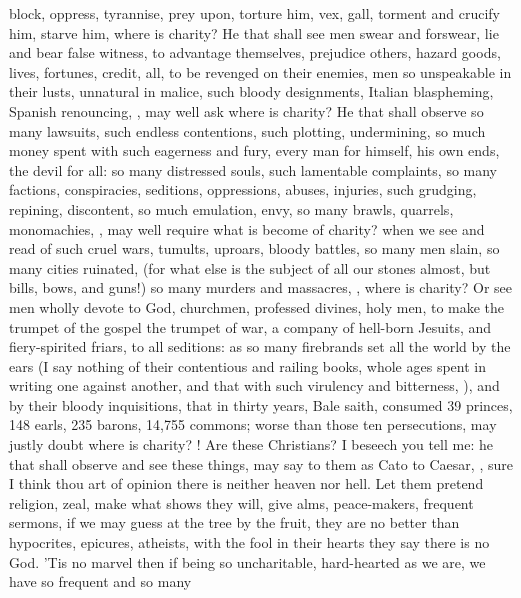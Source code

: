 {block, oppress, tyrannise, prey upon, torture him, vex, gall, torment
and crucify him, starve him, where is charity? He that shall see men
swear and forswear, lie and bear false witness, to advantage
themselves, prejudice others, hazard goods, lives, fortunes, credit,
all, to be revenged on their enemies, men so unspeakable in their
lusts, unnatural in malice, such bloody designments, Italian
blaspheming, Spanish renouncing, \etc{}, may well ask where is charity? He
that shall observe so many lawsuits, such endless contentions, such
plotting, undermining, so much money spent with such eagerness and
fury, every man for himself, his own ends, the devil for all: so many
distressed souls, such lamentable complaints, so many factions,
conspiracies, seditions, oppressions, abuses, injuries, such grudging,
repining, discontent, so much emulation, envy, so many brawls,
quarrels, monomachies, \etc{}, may well require what is become of charity?
when we see and read of such cruel wars, tumults, uproars, bloody
battles, so many men slain, so many cities ruinated, \etc{} (for
what else is the subject of all our stones almost, but bills, bows, and
guns!) so many murders and massacres, \etc{}, where is charity? Or see men
wholly devote to God, churchmen, professed divines, holy men, to
make the trumpet of the gospel the trumpet of war, a company of
hell-born Jesuits, and fiery-spirited friars,  to all
seditions: as so many firebrands set all the world by the ears (I say
nothing of their contentious and railing books, whole ages spent in
writing one against another, and that with such virulency and
bitterness, ), and by their bloody
inquisitions, that in thirty years, Bale saith, consumed 39 princes,
148 earls, 235 barons, 14,755 commons; worse than those ten
persecutions, may justly doubt where is charity? ! Are these Christians? I beseech you tell me: he that
shall observe and see these things, may say to them as Cato to Caesar,
, sure I think thou art
of opinion there is neither heaven nor hell. Let them pretend religion,
zeal, make what shows they will, give alms, peace-makers, frequent
sermons, if we may guess at the tree by the fruit, they are no better
than hypocrites, epicures, atheists, with the fool in their
hearts they say there is no God. 'Tis no marvel then if being so
uncharitable, hard-hearted as we are, we have so frequent and so many
}
